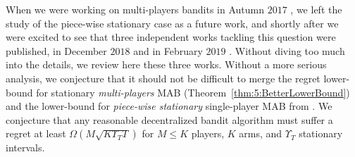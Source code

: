 When we were working on multi-players bandits in Autumn $2017$ \cite{Besson2018ALT}, we left the study of the piece-wise stationary case as a future work, and shortly after we were excited to see that three independent works tackling this question were published, in December $2018$ \cite{WeiSrivastava18Distributed} and in February $2019$ \cite{AlaturLevyKrause19,bande2019adversarial}.
Without diving too much into the details, we review here these three works.
Without a more serious analysis, we conjecture that it should not be difficult to merge the regret lower-bound for stationary \emph{multi-players} MAB (Theorem~\ref{thm:5:BetterLowerBound}) and the lower-bound for \emph{piece-wise stationary} single-player MAB from \cite{Garivier11UCBDiscount}.
We conjecture that any reasonable decentralized bandit algorithm must suffer a regret at least $\Omega(M \sqrt{K \Upsilon_T T})$ for $M \leq K$ players, $K$ arms, and $\Upsilon_T$ stationary intervals.

